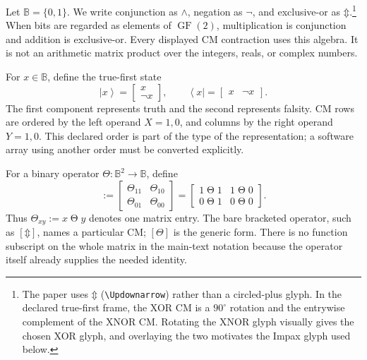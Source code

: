 \documentclass[11pt]{article}
\newcommand{\Bool}{\mathbb{B}}
\newcommand{\GFtwo}{\operatorname{GF}(2)}
\newcommand{\XOR}{\mathbin{\Updownarrow}}
\newcommand{\CM}[1]{[#1]}
\newcommand{\stateket}[1]{\left|#1\right\rangle}
\newcommand{\statebra}[1]{\left\langle#1\right|}
\begin{document}
Let $\Bool=\{0,1\}$. We write conjunction as $\wedge$, negation as $\neg$,
and exclusive-or as $\XOR$.\footnote{The paper uses $\XOR$
(\texttt{\textbackslash Updownarrow}) rather than a circled-plus glyph. In
the declared true-first frame, the XOR CM is a $90^\circ$ rotation and the
entrywise complement of the XNOR CM. Rotating the XNOR glyph visually gives
the chosen XOR glyph, and overlaying the two motivates the Impax glyph used
below.} When bits are regarded as elements of $\GFtwo$, multiplication is
conjunction and addition is exclusive-or. Every displayed CM contraction uses
this algebra. It is not an arithmetic matrix product over the integers, reals,
or complex numbers.

For $x\in\Bool$, define the true-first state
\begin{equation}
  \stateket{x}=\begin{bmatrix}x\\ \neg x\end{bmatrix},
  \qquad
  \statebra{x}=\begin{bmatrix}x&\neg x\end{bmatrix}.
  \label{eq:true-first-state}
\end{equation}
The first component represents truth and the second represents falsity. CM
rows are ordered by the left operand $X=1,0$, and columns by the right operand
$Y=1,0$. This declared order is part of the type of the representation; a
software array using another order must be converted explicitly.

For a binary operator $\Theta:\Bool^2\rightarrow\Bool$, define
\begin{equation}
  \CM{\Theta}
  :=
  \begin{bmatrix}
    \Theta_{11} & \Theta_{10}\\
    \Theta_{01} & \Theta_{00}
  \end{bmatrix}
  =
  \begin{bmatrix}
    1\mathbin{\Theta}1 & 1\mathbin{\Theta}0\\
    0\mathbin{\Theta}1 & 0\mathbin{\Theta}0
  \end{bmatrix}.
  \label{eq:cm-definition}
\end{equation}
Thus $\Theta_{xy}:=x\mathbin{\Theta}y$ denotes one matrix entry. The bare
bracketed operator, such as $\CM{\XOR}$, names a particular CM; $\CM{\Theta}$
is the generic form. There is no function subscript on the whole matrix in the
main-text notation because the operator itself already supplies the needed
identity.
\end{document}
